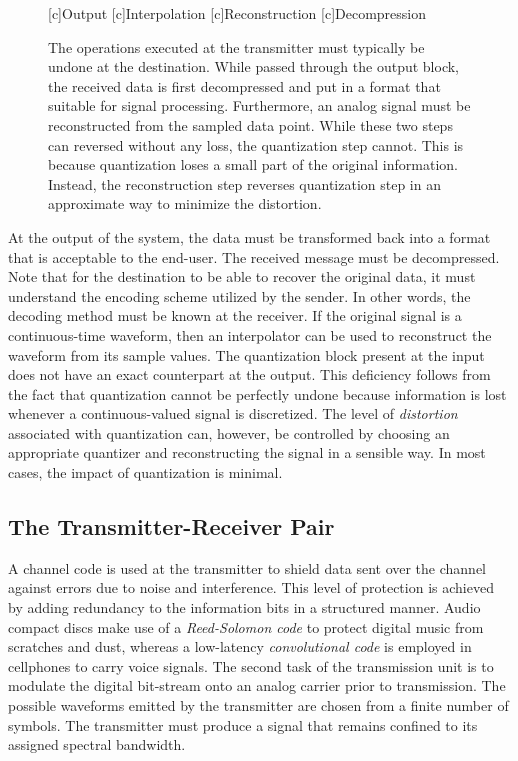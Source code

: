 \begin{figure}[htbp]
\begin{center}
\begin{psfrags}
[c]{Output}
[c]{Interpolation}
[c]{Reconstruction}
[c]{Decompression}
\end{psfrags}
\end{center}
\caption{The operations executed at the transmitter must typically be undone at the destination.
While passed through the output block, the received data is first decompressed and put in a format that suitable for signal processing.
Furthermore, an analog signal must be reconstructed from the sampled data point.
While these two steps can reversed without any loss, the quantization step cannot.
This is because quantization loses a small part of the original information.
Instead, the reconstruction step reverses quantization step in an approximate way to minimize the distortion.}
\label{figure:BlockOutput}
\end{figure}

At the output of the system, the data must be transformed back into a format that is acceptable to the end-user.
The received message must be decompressed.
Note that for the destination to be able to recover the original data, it must understand the encoding scheme utilized by the sender.
In other words, the decoding method must be known at the receiver.
If the original signal is a continuous-time waveform, then an interpolator can be used to reconstruct the waveform from its sample values.
The quantization block present at the input does not have an exact counterpart at the output.
This deficiency follows from the fact that quantization cannot be perfectly undone because information is lost whenever a continuous-valued signal is discretized.
The level of \emph{distortion} associated with quantization can, however, be controlled by choosing an appropriate quantizer and reconstructing the signal in a sensible way.
In most cases, the impact of quantization is minimal.


\subsection{The Transmitter-Receiver Pair}

A channel code is used at the transmitter to shield data sent over the channel against errors due to noise and interference.
This level of protection is achieved by adding redundancy to the information bits in a structured manner.
Audio compact discs make use of a \emph{Reed-Solomon code} to protect digital music from scratches and dust, whereas a low-latency \emph{convolutional code} is employed in cellphones to carry voice signals.
The second task of the transmission unit is to modulate the digital bit-stream onto an analog carrier prior to transmission.
The possible waveforms emitted by the transmitter are chosen from a finite number of symbols.
The transmitter must produce a signal that remains confined to its assigned spectral bandwidth.

